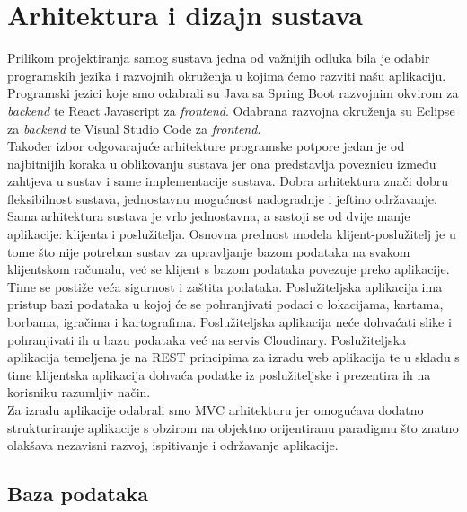 \chapter{Arhitektura i dizajn sustava}

		{Prilikom projektiranja samog sustava jedna od važnijih odluka bila je odabir programskih jezika i razvojnih okruženja u kojima ćemo razviti našu aplikaciju. Programski jezici koje smo odabrali su Java sa Spring Boot razvojnim okvirom za \textit{backend} te React Javascript za \textit{frontend}. Odabrana razvojna okruženja su Eclipse za \textit{backend} te Visual Studio Code za \textit{frontend}.}	\\
		
		{Također izbor odgovarajuće arhitekture programske potpore jedan je od najbitnijih koraka u oblikovanju sustava jer ona predstavlja poveznicu između zahtjeva u sustav i same implementacije sustava. Dobra arhitektura znači dobru fleksibilnost sustava, jednostavnu mogućnost nadogradnje i jeftino održavanje.}\\
		
		{Sama arhitektura sustava je vrlo jednostavna, a sastoji se od dvije manje aplikacije: klijenta i poslužitelja. Osnovna prednost modela klijent-poslužitelj je u tome što nije potreban sustav za upravljanje bazom podataka na svakom klijentskom računalu, već se klijent s bazom podataka povezuje preko aplikacije. Time se postiže veća sigurnost i zaštita podataka. Poslužiteljska aplikacija ima pristup bazi podataka u kojoj će se pohranjivati podaci o lokacijama, kartama, borbama, igračima i kartografima. Poslužiteljska aplikacija neće dohvaćati slike i pohranjivati ih u bazu podataka već na servis Cloudinary. Poslužiteljska aplikacija temeljena je na REST principima za izradu web aplikacija te u skladu s time klijentska aplikacija dohvaća podatke iz poslužiteljske i prezentira ih na korisniku razumljiv način.}\\
		
		{Za izradu aplikacije odabrali smo MVC arhitekturu jer omogućava dodatno strukturiranje aplikacije s obzirom na objektno orijentiranu paradigmu što znatno olakšava nezavisni razvoj, ispitivanje i održavanje aplikacije.}		

				
		\section{Baza podataka}
			
